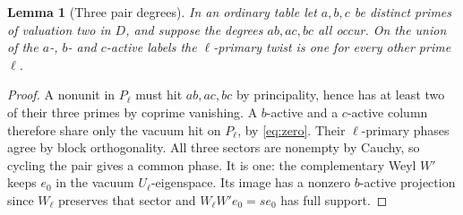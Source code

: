 \documentclass[11pt,a4paper]{article}
\numberwithin{equation}{section}
\newtheorem{lemma}[theorem]{Lemma}
\theoremstyle{remark}
\begin{document}
\begin{lemma}[Three pair degrees]\label{fam:M:8.2}\label{lem:pair-witness}
In an ordinary table let \(a,b,c\) be distinct primes of valuation two
in \(D\), and suppose the degrees \(ab,ac,bc\) all occur.
On the union of the \(a\)-, \(b\)- and \(c\)-active labels the
\(\ell\)-primary twist is one for every other prime \(\ell\).
\end{lemma}
\begin{proof}
A nonunit in $P_\ell$ must hit $ab,ac,bc$ by principality, hence has
at least two of their three primes by coprime vanishing. A $b$-active
and a $c$-active column therefore share only the vacuum hit on $P_\ell$,
by \eqref{eq:zero}. Their $\ell$-primary phases agree by block
orthogonality. All three sectors are nonempty by Cauchy, so cycling
the pair gives a common phase. It is one: the complementary Weyl
$W'$ keeps $e_0$ in the vacuum $U_\ell$-eigenspace. Its image has a
nonzero $b$-active projection since $W_\ell$ preserves that sector
and $W_\ell W'e_0=s e_0$ has full support.
\end{proof}
\end{document}
